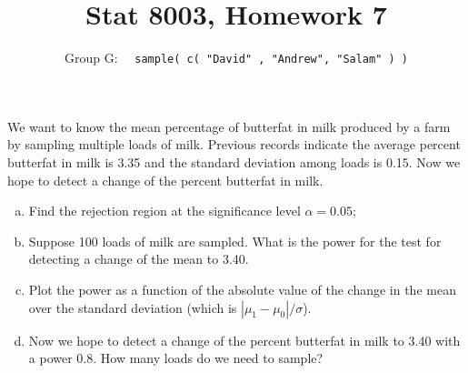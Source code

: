 \documentclass[12pt]{article}
\newenvironment{question}[2][Question]{\begin{trivlist}
\item[\hskip \labelsep {\bfseries #1}\hskip \labelsep {\bfseries #2.}]}{\end{trivlist}}
\begin{document}
 \renewcommand{\arraystretch}{1.3}
 \renewcommand{\thefootnote}{\fnsymbol{footnote}}	
 
\title{Stat 8003, Homework 7}%
\author{Group G: \ \ \texttt{sample( c( "David" , "Andrew",  "Salam" ) )}
\\ %
} %
 
\maketitle
 
 \begin{question}{7.1} We want to know the mean percentage of butterfat in milk produced by a farm by sampling
multiple loads of milk. Previous records indicate the average percent butterfat in milk is 3.35
and the standard deviation among loads is 0.15. Now we hope to detect a change of the percent
butterfat in milk.  

\begin{enumerate}[(a)]
\item Find the rejection region at the significance level $\alpha = 0.05$;
\item Suppose 100 loads of milk are sampled. What is the power for the test for detecting a change of the mean to 3.40.
\item Plot the power as a function of the absolute value of the change in the mean over the standard deviation (which is $ | \mu_1 - \mu_0 | / \sigma$).
\item Now we hope to detect a change of the percent butterfat in milk to 3.40 with a power 0.8. How many loads do we need to sample?
\end{enumerate}

\end{question} 
\end{document}

